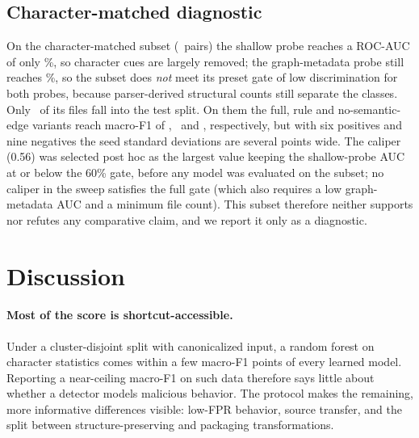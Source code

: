 \documentclass[pdflatex,sn-mathphys-num]{sn-jnl}
\begin{document}
\subsection{Character-matched diagnostic}\label{sec:r-char}
On the character-matched subset (\CharMatchedPairs\ pairs) the shallow probe
reaches a ROC-AUC of only \CharMatchedShallowAuc\%, so character cues are largely
removed; the graph-metadata probe still reaches \CharMatchedGraphmetaAuc\%, so the
subset does \emph{not} meet its preset gate of low discrimination for both
probes, because parser-derived structural counts still separate the classes.
Only \CharMatchedN\ of its files fall into the test split. On them the full,
rule and no-semantic-edge variants reach macro-F1 of \CharMatchedFullFOne,
\CharMatchedRuleFOne\ and \CharMatchedNoESemFOne, respectively, but with six
positives and nine negatives the seed standard deviations are several points
wide. The caliper (0.56) was selected post hoc as the largest value keeping the
shallow-probe AUC at or below the 60\% gate, before any model was
evaluated on the subset; no caliper in the sweep satisfies the full gate (which
also requires a low graph-metadata AUC and a minimum file count). This subset
therefore neither supports nor refutes any comparative claim, and we report it
only as a diagnostic.

\section{Discussion}\label{sec:discussion}
\paragraph{Most of the score is shortcut-accessible.} Under a cluster-disjoint
split with canonicalized input, a random forest on character statistics comes
within a few macro-F1 points of every learned model. Reporting a near-ceiling
macro-F1 on such data therefore says little about whether a detector models
malicious behavior. The protocol makes the remaining, more informative
differences visible: low-FPR behavior, source transfer, and the split between
structure-preserving and packaging transformations.
\end{document}
